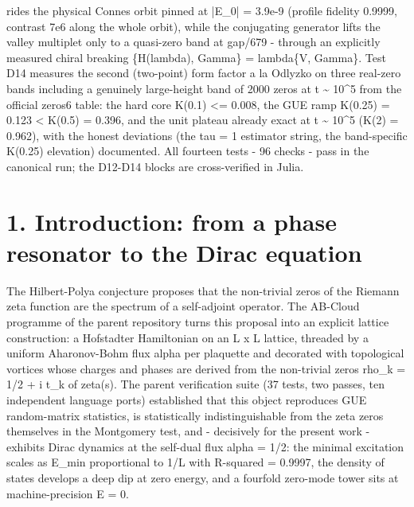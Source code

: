 \documentclass[11pt,a4paper]{article}
\begin{document}
\begin{tcolorbox}[breakable, colback=labblue!6, colframe=labblue!70!black, boxrule=0.6pt, title={Abstract / Аннотация}]
rides the physical Connes orbit pinned at |E\_\allowbreak{}0| = 3.9e-9 (profile fidelity 0.9999, contrast 7e6 along the whole orbit), while the conjugating generator lifts the valley multiplet only to a quasi-zero band at gap/679 - through an explicitly measured chiral breaking \{H(lambda), Gamma\} = lambda\{V, Gamma\}. Test D14 measures the second (two-point) form factor a la Odlyzko on three real-zero bands including a genuinely large-height band of 2000 zeros at t \textasciitilde{} 10\^{}5 from the official zeros6 table: the hard core K(0.1) <= 0.008, the GUE ramp K(0.25) = 0.123 < K(0.5) = 0.396, and the unit plateau already exact at t \textasciitilde{} 10\^{}5 (K(2) = 0.962), with the honest deviations (the tau = 1 estimator string, the band-specific K(0.25) elevation) documented. All fourteen tests - 96 checks - pass in the canonical run; the D12-D14 blocks are cross-verified in Julia.
\end{tcolorbox}
\tableofcontents
\newpage
\section{1. Introduction: from a phase resonator to the Dirac equation}
The Hilbert-Polya conjecture proposes that the non-trivial zeros of the Riemann zeta function are the spectrum of a self-adjoint operator. The AB-Cloud programme of the parent repository turns this proposal into an explicit lattice construction: a Hofstadter Hamiltonian on an L x L lattice, threaded by a uniform Aharonov-Bohm flux alpha per plaquette and decorated with topological vortices whose charges and phases are derived from the non-trivial zeros rho\_\allowbreak{}k = 1/2 + i t\_\allowbreak{}k of zeta(s). The parent verification suite (37 tests, two passes, ten independent language ports) established that this object reproduces GUE random-matrix statistics, is statistically indistinguishable from the zeta zeros themselves in the Montgomery test, and - decisively for the present work - exhibits Dirac dynamics at the self-dual flux alpha = 1/2: the minimal excitation scales as E\_\allowbreak{}min proportional to 1/L with R-squared = 0.9997, the density of states develops a deep dip at zero energy, and a fourfold zero-mode tower sits at machine-precision E = 0.
\end{document}
